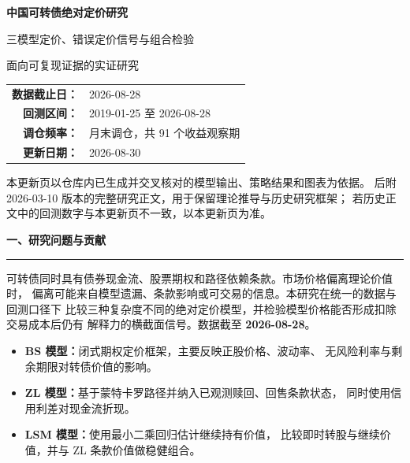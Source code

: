 \documentclass[11pt,a4paper]{ctexart}
\newcommand{\sectionbar}[1]{%
  \vspace{0.4em}
  {\color{navy}\Large\bfseries #1}\par
  \vspace{0.2em}
  {\color{blue}\rule{\textwidth}{1.2pt}}\par
}
\begin{document}


\begin{titlepage}
  \centering
  \vspace*{2.1cm}
  {\color{navy}\Huge\bfseries 中国可转债绝对定价研究\par}
  \vspace{0.45cm}
  {\color{blue}\LARGE 三模型定价、错误定价信号与组合检验\par}
  \vspace{0.9cm}
  {\Large 面向可复现证据的实证研究\par}
  \vspace{1.5cm}

  \renewcommand{\arraystretch}{1.45}
  \begin{tabular}{>{\bfseries}rl}
    数据截止日： & 2026-08-28 \\
    回测区间： & 2019-01-25 至 2026-08-28 \\
    调仓频率： & 月末调仓，共 91 个收益观察期 \\
    更新日期： & 2026-08-30 \\
  \end{tabular}

  \vfill
  \begin{minipage}{0.88\textwidth}
    \small\color{muted}
    本更新页以仓库内已生成并交叉核对的模型输出、策略结果和图表为依据。
    后附 2026-03-10 版本的完整研究正文，用于保留理论推导与历史研究框架；
    若历史正文中的回测数字与本更新页不一致，以本更新页为准。
  \end{minipage}
\end{titlepage}

\sectionbar{一、研究问题与贡献}

可转债同时具有债券现金流、股票期权和路径依赖条款。市场价格偏离理论价值时，
偏离可能来自模型遗漏、条款影响或可交易的信息。本研究在统一的数据与回测口径下
比较三种复杂度不同的绝对定价模型，并检验模型价格能否形成扣除交易成本后仍有
解释力的横截面信号。数据截至 \textbf{2026-08-28}。

\begin{itemize}
  \item \textbf{BS 模型：}闭式期权定价框架，主要反映正股价格、波动率、
        无风险利率与剩余期限对转债价值的影响。
  \item \textbf{ZL 模型：}基于蒙特卡罗路径并纳入已观测赎回、回售条款状态，
        同时使用信用利差对现金流折现。
  \item \textbf{LSM 模型：}使用最小二乘回归估计继续持有价值，
        比较即时转股与继续价值，并与 ZL 条款价值做稳健组合。
\end{itemize}
\end{document}
